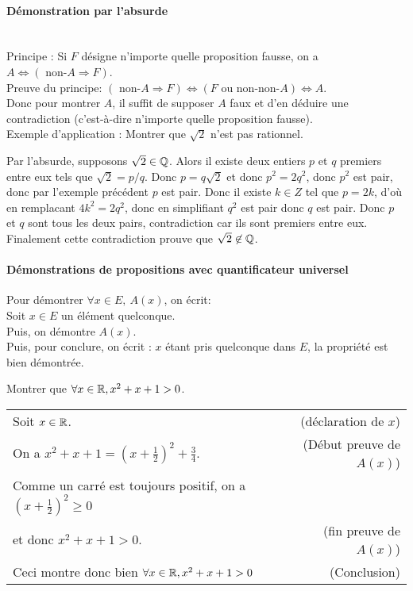 {\paragraph{Démonstration par l'absurde}$ $\\
\\
Principe : Si $F$ désigne n'importe quelle proposition fausse, on a $A \Leftrightarrow (\text{ non-}A \Rightarrow F)$.\\
Preuve du principe: $(\text{ non-}A \Rightarrow F) \Leftrightarrow (F\text{ ou non-non-}A)\Leftrightarrow A$.\\
 Donc pour montrer $A$, il suffit de supposer $A$ faux et d'en déduire une contradiction (c'est-à-dire n'importe quelle proposition fausse).\\
Exemple d'application : Montrer que $\sqrt{2}$ n'est pas rationnel.
\begin{red}
Par l'absurde, supposons $\sqrt{2}\in\mathbb{Q}$. Alors il existe deux entiers $p$ et $q$ premiers entre eux tels que $\sqrt{2} = p/q$. Donc $p = q\sqrt{2}$ et donc $p^2 = 2 q^2$, donc $p^2$ est pair, donc par l'exemple précédent $p$ est pair. Donc il existe $k\in Z$ tel que $p = 2k$, d'où en remplacant $4k^2 = 2 q^2$, donc en simplifiant $q^2$ est pair donc $q$ est pair. Donc $p$ et $q$ sont tous les deux pairs, contradiction car ils sont premiers entre eux. Finalement cette contradiction prouve que $\sqrt{2} \not\in \mathbb{Q}$.
\end{red}

\paragraph{Démonstrations de propositions avec quantificateur universel}$ $\\

Pour démontrer $\forall x\in E,\:A(x)$, on écrit:\\
\og Soit $x\in E$ un élément quelconque\fg.\\
Puis, on démontre $A(x)$.\\
Puis, pour conclure, on écrit : \og $x$ étant pris quelconque dans $E$, la propriété est bien démontrée\fg.\\


\begin{exemple}
Montrer que $\forall x\in \mathbb{R}, x^2+x+1> 0$\fg.
\begin{red}
\begin{tabular}{lr}
Soit $x\in \mathbb{R}$. & (déclaration de $x$)\\
On a $x^2+x+1 = (x+\frac12)^2+\frac34$. & (Début preuve de $A(x)$)\\
Comme un carré est toujours positif, on a $(x+\frac12)^2 \geq 0$ & \\
 et donc  $x^2+x+1>0$. & (fin preuve de $A(x)$)\\
Ceci montre donc bien $\forall x\in \mathbb{R}, x^2+x+1>0$ & (Conclusion)\\
\end{tabular}
\end{red}
\end{exemple}


}
